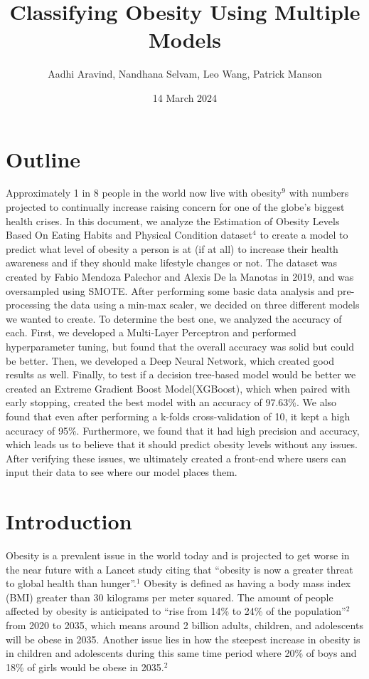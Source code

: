 \documentclass[11pt]{article}
\title{Classifying Obesity Using Multiple Models}
\author{Aadhi Aravind, Nandhana Selvam, Leo Wang, Patrick Manson}
\date{14 March 2024}
\begin{document}
\maketitle

\section{Outline}
    Approximately 1 in 8 people in the world now live with obesity$^{9}$ with numbers projected to continually increase raising concern for one of the globe's biggest health crises. In this document, we analyze the Estimation of Obesity Levels Based On Eating Habits and Physical Condition dataset$^{4}$ to create a model to predict what level of obesity a person is at (if at all) to increase their health awareness and if they should make lifestyle changes or not. The dataset was created by  Fabio Mendoza Palechor and Alexis De la Manotas in 2019, and was oversampled using SMOTE. After performing some basic data analysis and pre-processing the data using a min-max scaler, we decided on three different models we wanted to create. To determine the best one, we analyzed the accuracy of each. First, we developed a Multi-Layer Perceptron and performed hyperparameter tuning, but found that the overall accuracy was solid but could be better. Then, we developed a Deep Neural Network, which created good results as well. Finally, to test if a decision tree-based model would be better we created an Extreme Gradient Boost Model(XGBoost), which when paired with early stopping, created the best model with an accuracy of 97.63\%. We also found that even after performing a k-folds cross-validation of 10, it kept a high accuracy of 95\%. Furthermore, we found that it had high precision and accuracy, which leads us to believe that it should predict obesity levels without any issues. After verifying these issues, we ultimately created a front-end where users can input their data to see where our model places them.
\section{Introduction}

    Obesity is a prevalent issue in the world today and is projected to get worse in the near future with a Lancet study citing that “obesity is now a greater threat to global health than hunger”.$^{1}$ Obesity is defined as having a body mass index (BMI) greater than 30 kilograms per meter squared. The amount of people affected by obesity is anticipated to “rise from 14\% to 24\% of the population”$^{2}$ from 2020 to 2035, which means around 2 billion adults, children, and adolescents will be obese in 2035. Another issue lies in how the steepest increase in obesity is in children and adolescents during this same time period where 20\% of boys and 18\% of girls would be obese in 2035.$^{2}$
	
\end{document}
